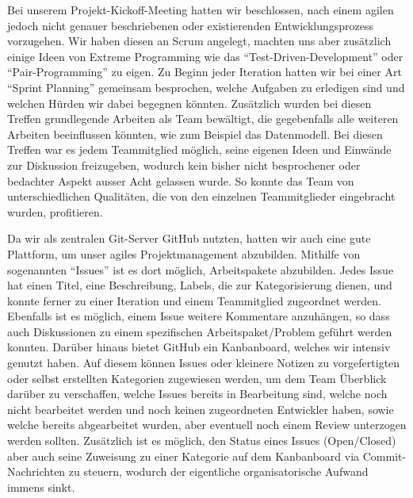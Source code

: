 \documentclass[12pt,DIV14,BCOR10mm,a4paper,parskip=half-,headsepline,headinclude,english,ngerman,bibliography=totocnumbered]{scrreprt}
\begin{document}
Bei unserem Projekt-Kickoff-Meeting hatten wir beschlossen, nach einem agilen jedoch nicht genauer beschriebenen oder existierenden Entwicklungsprozess vorzugehen. Wir haben diesen an Scrum angelegt, machten uns aber zusätzlich einige Ideen von Extreme Programming wie das \enquote{Test-Driven-Development} oder \enquote{Pair-Programming} zu eigen.
Zu Beginn jeder Iteration hatten wir bei einer Art \enquote{Sprint Planning} gemeinsam besprochen, welche Aufgaben zu erledigen sind und welchen Hürden wir dabei begegnen könnten. Zusätzlich wurden bei diesen Treffen grundlegende Arbeiten als Team bewältigt, die gegebenfalls alle weiteren Arbeiten beeinflussen könnten, wie zum Beispiel das Datenmodell.
Bei diesen Treffen war es jedem Teammitglied möglich, seine eigenen Ideen und Einwände zur Diskussion freizugeben, wodurch kein bisher nicht besprochener oder bedachter Aspekt ausser Acht gelassen wurde. So konnte das Team von unterschiedlichen Qualitäten, die von den einzelnen Teammitglieder eingebracht wurden, profitieren.

Da wir als zentralen Git-Server GitHub nutzten, hatten wir auch eine gute Plattform, um unser agiles Projektmanagement abzubilden.
Mithilfe von sogenannten \enquote{Issues} ist es dort möglich, Arbeitspakete abzubilden.
Jedes Issue hat einen Titel, eine Beschreibung, Labels, die zur Kategorisierung dienen, und konnte ferner zu einer Iteration und einem Teammitglied zugeordnet werden.
Ebenfalls ist es möglich, einem Issue weitere Kommentare anzuhängen, so dass auch Diskussionen zu einem spezifischen Arbeitspaket/Problem geführt werden konnten.
Darüber hinaus bietet GitHub ein Kanbanboard, welches wir intensiv genutzt haben.
Auf diesem können Issues oder kleinere Notizen zu vorgefertigten oder selbst erstellten Kategorien zugewiesen werden, um dem Team Überblick darüber zu verschaffen, welche Issues bereits in Bearbeitung sind, welche noch nicht bearbeitet werden und noch keinen zugeordneten Entwickler haben, sowie welche bereits abgearbeitet wurden, aber eventuell noch einem Review unterzogen werden sollten.
Zusätzlich ist es möglich, den Status eines Issues (Open/Closed) aber auch seine Zuweisung zu einer Kategorie auf dem Kanbanboard via Commit-Nachrichten zu steuern, wodurch der eigentliche organisatorische Aufwand immens sinkt.
\end{document}
